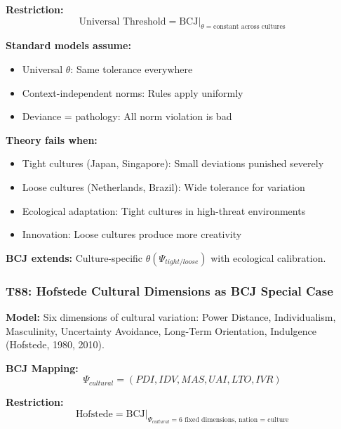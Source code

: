 \textbf{Restriction:}
\begin{equation}
\text{Universal Threshold} = \text{BCJ} \big|_{\theta = \text{constant across cultures}}
\end{equation}

\begin{tcolorbox}[colback=red!5!white, colframe=red!75!black,
    title=Boundary Condition: Where Uniform Thresholds Fail]
\textbf{Standard models assume:}
\begin{itemize}[nosep]
\item Universal $\theta$: Same tolerance everywhere
\item Context-independent norms: Rules apply uniformly
\item Deviance = pathology: All norm violation is bad
\end{itemize}

\textbf{Theory fails when:}
\begin{itemize}[nosep]
\item Tight cultures (Japan, Singapore): Small deviations punished severely
\item Loose cultures (Netherlands, Brazil): Wide tolerance for variation
\item Ecological adaptation: Tight cultures in high-threat environments
\item Innovation: Loose cultures produce more creativity
\end{itemize}

\textbf{BCJ extends:} Culture-specific $\theta(\Psi_{tight/loose})$ with ecological calibration.
\end{tcolorbox}

\subsubsection*{T88: Hofstede Cultural Dimensions as BCJ Special Case}

\textbf{Model:} Six dimensions of cultural variation: Power Distance, Individualism, Masculinity, Uncertainty Avoidance, Long-Term Orientation, Indulgence (Hofstede, 1980, 2010).

\textbf{BCJ Mapping:}
\begin{equation}
\Psi_{cultural} = (PDI, IDV, MAS, UAI, LTO, IVR)
\end{equation}

\textbf{Restriction:}
\begin{equation}
\text{Hofstede} = \text{BCJ} \big|_{\Psi_{cultural} = \text{6 fixed dimensions}, \, \text{nation = culture}}
\end{equation}

